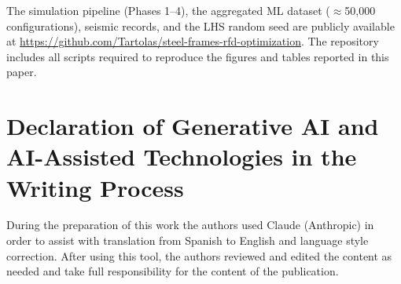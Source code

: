 \documentclass[preprint,12pt,authoryear]{elsarticle}
\begin{document}
The simulation pipeline (Phases 1--4), the aggregated ML dataset
($\approx$50,000 configurations), seismic records, and the LHS random seed
are publicly available at
\url{https://github.com/Tartolas/steel-frames-rfd-optimization}.
The repository includes all scripts required to reproduce the figures and
tables reported in this paper.

\section*{Declaration of Generative AI and AI-Assisted Technologies in the
Writing Process}

During the preparation of this work the authors used Claude (Anthropic) in order
to assist with translation from Spanish to English and language style correction.
After using this tool, the authors reviewed and edited the content as needed and
take full responsibility for the content of the publication.



\end{document}
